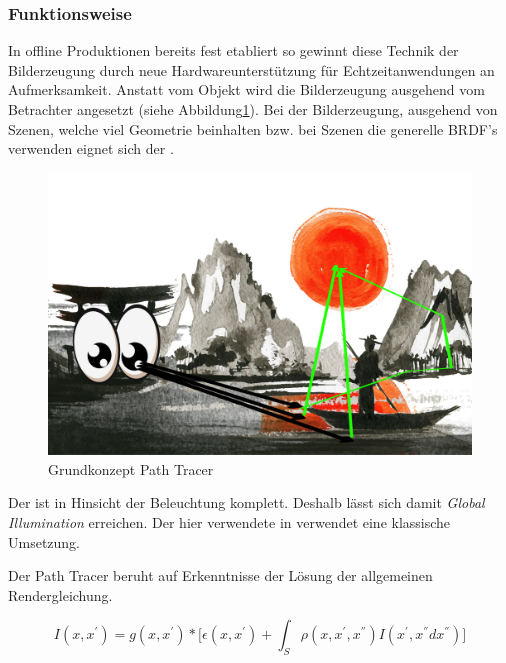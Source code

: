 \subsubsection{Funktionsweise}
In offline Produktionen bereits fest etabliert \cite{DisneyPathTracing} so gewinnt diese Technik
der Bilderzeugung durch neue Hardwareunterstützung für Echtzeitanwendungen an Aufmerksamkeit\cite{Sch19}.
Anstatt vom Objekt wird die Bilderzeugung ausgehend vom Betrachter angesetzt 
(siehe Abbildung\ref{pic::GrundkonzeptPathTracing}).
Bei der Bilderzeugung, ausgehend von Szenen, welche viel Geometrie beinhalten bzw. bei Szenen 
die generelle BRDF's verwenden eignet sich der .

\begin{figure}[H]
    \centering
    \includegraphics[width=\linewidth]{content/PathTracer/Bilder/PathTracerGuide.png}
    \caption{Grundkonzept Path Tracer}
    \label{pic::GrundkonzeptPathTracing}
\end{figure}

Der  ist in Hinsicht der Beleuchtung komplett. Deshalb lässt sich damit
\textit{Global Illumination} erreichen. Der hier verwendete  in 
\cite{Benty18} verwendet eine klassische Umsetzung.\par
Der Path Tracer beruht auf Erkenntnisse der Lösung der allgemeinen Rendergleichung.

\begin{equation}\label{eq:Allgemeine Rendergleichung}
    I(x,{x}^{'}) = g(x,{x}^{'}) * \biggl[\epsilon(x,{x}^{'}) + 
    \int_{S}^{} \rho(x,{x}^{'},{x}^{''})
    I({x}^{'},{x}^{''}d{x}^{''})\biggr] 
\end{equation}

